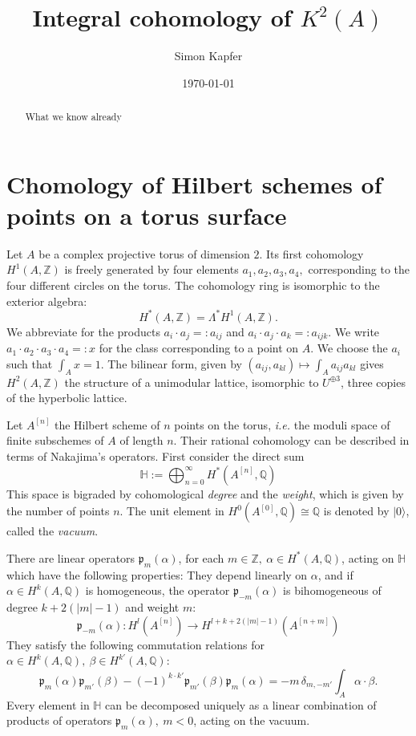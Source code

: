 \documentclass{amsart}
\newcommand{\hilb}[1]{^{[#1]}}
\newcommand{\ie}{{\it i.e. }}
\newcommand{\vac}{|0\rangle}
\newcommand{\p}{\mathfrak{p}}
\renewcommand{\H}{\mathbb{H}}
\newcommand{\Q}{\mathbb{Q}}
\newcommand{\Z}{\mathbb{Z}}
\theoremstyle{plain}
\theoremstyle{definition}
\theoremstyle{remark}
\begin{document}
\title{Integral cohomology of $K^2(A)$}


\author{Simon Kapfer}
\address{Simon Kapfer, Laboratoire de Math\'ematiques et Applications, UMR CNRS 6086, Universit\'e de Poitiers, T\'el\'eport 2, Boulevard Marie et Pierre Curie, F-86962 Futuroscope Chasseneuil}


\date{\today}


\begin{abstract} 
What we know already
\end{abstract}

\maketitle

\section{Chomology of Hilbert schemes of points on a torus surface}
Let $A$ be a complex projective torus of dimension $2$. Its first cohomology $H^1(A,\Z)$ is freely generated by four elements $a_1,a_2,a_3,a_4,$ corresponding to the four different circles on the torus. The cohomology ring is isomorphic to the exterior algebra:
$$
H^*(A,\Z) = \Lambda^* H^1(A,\Z).
$$
We abbreviate for the products $a_i\cdot a_j =: a_{ij}$ and $a_i\cdot a_j\cdot a_k =: a_{ijk}$. We write $a_1\cdot a_2\cdot a_3 \cdot a_4 =:x$ for the class corresponding to a point on $A$. We choose the $a_i$ such that $\int_A x = 1$.
The bilinear form, given by $(a_{ij},a_{kl})\mapsto\int_A a_{ij}a_{kl}$ gives $H^2(A,\Z)$ the structure of a unimodular lattice, isomorphic to $U^{\oplus 3}$, three copies of the hyperbolic lattice. 

Let $A\hilb{n}$ the Hilbert scheme of $n$ points on the torus, \ie the moduli space of finite subschemes of $A$ of length $n$. Their rational cohomology can be described in terms of Nakajima's operators. First consider the direct sum
$$
\H := \bigoplus_{n=0}^{\infty} H^*(A\hilb{n},\Q)
$$
This space is bigraded by cohomological \emph{degree} and the \emph{weight}, which is given by the number of points $n$. The unit element in $H^0(A\hilb{0},\Q) \cong \Q$ is denoted by $\vac$, called the \emph{vacuum}.

There are linear operators $\p_m(\alpha)$, for each $m\in \Z,\ \alpha \in H^*(A,\Q)$, acting on $\H$ which have the following properties: They depend linearly on $\alpha$, and if $\alpha\in H^k(A,\Q)$ is homogeneous, the operator $\p_{-m}(\alpha)$ is bihomogeneous of degree $k+2(|m|-1)$ and weight $m$:
$$
\p_{-m}(\alpha) : H^l(A\hilb{n}) \rightarrow H^{l+k+2(|m|-1)}(A\hilb{n+m})
$$
They satisfy the following commutation relations for $\alpha\in H^k(A,\Q),\ \beta\in H^{k'}(A,\Q)$:
$$
\p_{m}(\alpha)\p_{m'}(\beta) - (-1)^{k\cdot k'}\p_{m'}(\beta)\p_{m}(\alpha) = -m\,\delta_{m,-m'} \int_A \alpha\cdot\beta.
$$
Every element in $\H$ can be decomposed uniquely as a linear combination of products of operators $\p_{m}(\alpha),\ m<0$, acting on the vacuum. 
\end{document}
